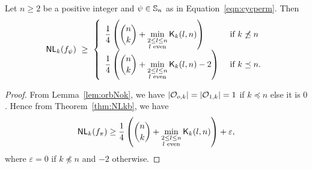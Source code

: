 \documentclass{llncs}
\begin{document}
\begin{theorem}\label{thm:NLk_bound}
Let $n \geq 2$ be a positive integer and $\psi \in \mathbb{S}_n$ as in  Equation~\ref{eqn:cycperm}.
Then $$\mathsf{NL}_{k}(f_\psi) ~\geq ~ 
\left\{ \begin{array}{ll}
\displaystyle{\frac{1}{4}\left({n \choose k} + \min_{\substack{2 \leq l \leq n \\ l \text{ even}}} \mathsf{K}_{k}(l,n)\right)}  & \text{ if }  k \not\preceq n \\
\displaystyle{\frac{1}{4}\left({n \choose k} + \min_{\substack{2 \leq l \leq n \\ l \text{ even}}} \mathsf{K}_{k}(l,n) - 2\right)} & \text{ if } k \preceq n.
\end{array}   \right.$$
\end{theorem}
\begin{proof}
	From Lemma~\ref{lem:orbNok}, we have $|\mathcal{O}_{o,k}| = |\mathcal{O}_{1,k}| = 1$ if 
	$k \preceq n$ else it is $0$. Hence from Theorem~\ref{thm:NLkb}, we have
	$$\mathsf{NL}_{k}(f_\pi) \geq 
	\displaystyle{\frac{1}{4}\left({n \choose k} + \min_{\substack{2 \leq l \leq n \\ l \text{ even}}} \mathsf{K}_{k}(l,n)\right)} + \varepsilon,$$
	where $\varepsilon=0$ if $k \not\preceq n$ and $-2$ otherwise.
\end{proof}
\end{document}

